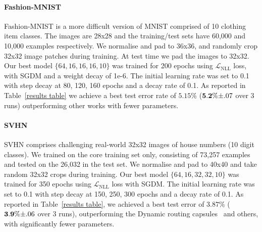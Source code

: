 \documentclass[letterpaper]{article} \usepackage{aaai20}  \usepackage{times}  \usepackage{helvet} \usepackage{courier}  \usepackage[hyphens]{url}  \usepackage{graphicx} \urlstyle{rm} \def\UrlFont{\rm}  \usepackage{graphicx}  \frenchspacing  \setlength{\pdfpagewidth}{8.5in}  \setlength{\pdfpageheight}{11in}  \nocopyright
\begin{document}
\paragraph{Fashion-MNIST} 
Fashion-MNIST is a more difficult version of MNIST comprised of 10 clothing item classes. The images are 28x28 and the training/test sets have 60,000 and 10,000 examples respectively. We normalise and pad to 36x36, and randomly crop 32x32 image patches during training. At test time we pad the images to 32x32. Our best model $\{64, 16, 16, 16, 10\}$ was trained for 200 epochs using $\mathcal{L}_{\mathrm{NLL}}$ loss, with SGDM and a weight decay of 1e-6. The initial learning rate was set to 0.1 with step decay at 80, 120, 160 epochs and a decay rate of 0.1. As reported in Table~\ref{results table} we achieve a best test error rate of $\mathbf{5.15}$\% ($\mathbf{5.2}\%\scriptsize{\pm.07}$ over 3 runs) outperforming other works with fewer parameters. 
\paragraph{SVHN}
SVHN comprises challenging real-world 32x32 images of house numbers (10 digit classes). We trained on the core training set only, consisting of 73,257 examples and tested on the 26,032 in the test set. We normalise and pad to 40x40 and take random 32x32 crops during training. Our best model $\{64, 16, 
32, 32, 10\}$ was trained for 350 epochs using $\mathcal{L}_{\mathrm{NLL}}$ loss with SGDM. The initial learning rate was set to 0.1 with step decay at 150, 250, 300 epochs and a decay rate of 0.1. As reported in Table~\ref{results table}, we achieved a best test error of $\mathbf{3.87}$\% ($\mathbf{3.9}\%\scriptsize{\pm.06}$ over 3 runs), outperforming the Dynamic routing capsules~\cite{sabour2017dynamic} and others, with significantly fewer parameters.
\end{document}
